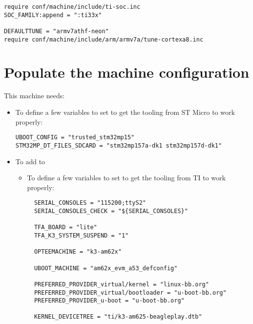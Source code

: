 \begin{verbatim}
require conf/machine/include/ti-soc.inc
SOC_FAMILY:append = ":ti33x"

DEFAULTTUNE = "armv7athf-neon"
require conf/machine/include/arm/armv7a/tune-cortexa8.inc
\end{verbatim}
  \fi
\fi
\section{Populate the machine configuration}

This  machine needs:

\if{}
\begin{itemize}
  \item To define a few variables to set to get the tooling from ST
    Micro to work properly:
\begin{verbatim}
UBOOT_CONFIG = "trusted_stm32mp15"
STM32MP_DT_FILES_SDCARD = "stm32mp157a-dk1 stm32mp157d-dk1"
\end{verbatim}
  \item To add  to 
\else
  \if{}
\begin{itemize}
  \item To define a few variables to set to get the tooling from TI
   to work properly:
\begin{verbatim}
  SERIAL_CONSOLES = "115200;ttyS2"
  SERIAL_CONSOLES_CHECK = "${SERIAL_CONSOLES}"

  TFA_BOARD = "lite"
  TFA_K3_SYSTEM_SUSPEND = "1"

  OPTEEMACHINE = "k3-am62x"

  UBOOT_MACHINE = "am62x_evm_a53_defconfig"

  PREFERRED_PROVIDER_virtual/kernel = "linux-bb.org"
  PREFERRED_PROVIDER_virtual/bootloader = "u-boot-bb.org"
  PREFERRED_PROVIDER_u-boot = "u-boot-bb.org"

  KERNEL_DEVICETREE = "ti/k3-am625-beagleplay.dtb"


\end{verbatim}
\end{itemize}
\end{itemize}
